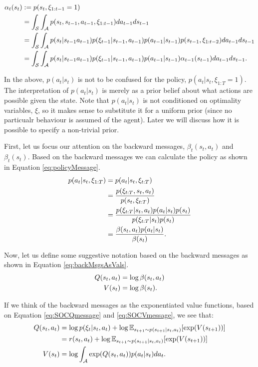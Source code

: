 \documentclass{report}
\numberwithin{equation}{section}
\numberwithin{figure}{section}
\numberwithin{table}{section}
\numberwithin{algorithm}{section}
\begin{document}
\begin{align}\label{eq:SOCforwardMessage}
  \alpha_t(s_t)&:=p(s_t, \xi_{1:t-1}=1)\notag\\
  &=\int_{\mathcal{S}}\int_{\mathcal{A}}p(s_t, s_{t-1},a_{t-1},\xi_{1:t-1})da_{t-1}ds_{t-1}\notag\\
  &=\int_{\mathcal{S}}\int_{\mathcal{A}}p(s_t|s_{t-1}a_{t-1})p(\xi_{t-1}|s_{t-1},a_{t-1})p(a_{t-1}|s_{t-1})p(s_{t-1}, \xi_{1:t-2})da_{t-1}ds_{t-1}\notag\\
  &=\int_{\mathcal{S}}\int_{\mathcal{A}}p(s_t|s_{t-1}a_{t-1})p(\xi_{t-1}|s_{t-1},a_{t-1})p(a_{t-1}|s_{t-1})\alpha_{t-1}(s_{t-1})da_{t-1}ds_{t-1}.
\end{align}

In the above, $p(a_t|s_t)$ is not to be confused for the policy, 
$p(a_t|s_t, \xi_{1:T}=1)$. The interpretation of $p(a_t|s_t)$ 
is merely as a prior belief about what actions are 
possible given the state. 
Note that $p(a_t|s_t)$ is not conditioned on optimality variables, 
$\xi$, so it makes sense to substitute it for a uniform prior 
(since no particualr behaviour is assumed of the agent). Later 
we will discuss how it is possible to specify a non-trivial prior.


First, let us focus our attention on the backward messages, 
$\beta_t(s_t, a_t)$ and $\beta_t(s_t)$. 
Based on the backward messages we can calculate the policy as 
shown in Equation \ref{eq:policyMessage}.
\begin{align}\label{eq:policyMessage}
  p(a_t|s_t,\xi_{1:T})&=p(a_t|s_t,\xi_{t:T})\notag\\
  &=\frac{p(\xi_{t:T},s_t,a_t)}{p(s_t,\xi_{t:T})}\notag\\
  &=\frac{p(\xi_{t:T}|s_t, a_t)p(a_t|s_t)p(s_t)}{p(\xi_{t:T}|s_t)p(s_t)}\notag\\
  &=\frac{\beta(s_t, a_t)p(a_t|s_t)}{\beta(s_t)}.
\end{align}

Now, let us define some 
suggestive notation based on the backward messages as shown 
in Equation \ref{eq:backMsgsAsVals}.
\begin{align}\label{eq:backMsgsAsVals}
  Q(s_t, a_t)&=\log \beta(s_t, a_t)\notag\\
  V(s_t)&=\log \beta(s_t).
\end{align}

If we think of the backward messages as the exponentiated 
value functions, based on Equation \ref{eq:SOCQmessage} and 
\ref{eq:SOCVmessage}, we see that:
\begin{align}\label{eq:badVals}
  Q(s_t, a_t)&=\log p(\xi_t|s_t, a_t) + \log\mathbb{E}_{s_{t+1}\sim p(s_{t+1}|s_t, a_t)}[\exp (V(s_{t+1}))]\notag\\
  &=r(s_t, a_t) + \log\mathbb{E}_{s_{t+1}\sim p(s_{t+1}|s_t, a_t)}[\exp (V(s_{t+1}))]\notag\\
  V(s_t)&=\log \int_{\mathcal{A}}\exp (Q(s_t, a_t))p(a_t|s_t)da_t.
\end{align}
\end{document}
